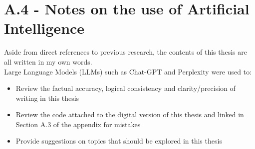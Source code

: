 \documentclass[12pt]{article}
\begin{document}
\section*{A.4 - Notes on the use of Artificial Intelligence}
Aside from direct references to previous research, the contents of this thesis are all written in my own words.\\
Large Language Models (LLMs) such as Chat-GPT and Perplexity were used to:
\begin{itemize}
\item Review the factual accuracy, logical consistency and clarity/precision of writing in this thesis
\item Review the code attached to the digital version of this thesis and linked in Section A.3 of the appendix for mistakes
\item Provide suggestions on topics that should be explored in this thesis
\end{itemize}
\end{document}
